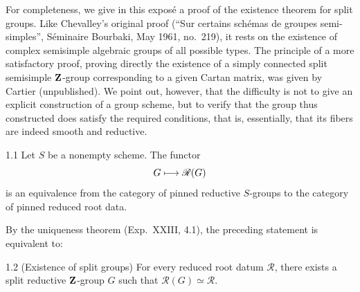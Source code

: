 \label{XXV}

\setcounter{footnote}{-1}
For completeness, we give in this expos\'e a proof of the existence theorem for split groups. Like Chevalley's original proof (``Sur certains sch\'emas de groupes semi-simples'', S\'eminaire Bourbaki, May 1961, no.~219), it rests on the existence of complex semisimple algebraic groups of all possible types. The principle of a more satisfactory proof, proving directly the existence of a simply connected split semisimple $\mathbf{Z}$-group corresponding to a given Cartan matrix, was given by Cartier (unpublished). We point out, however, that the difficulty is not to give an explicit construction of a group scheme, but to verify that the group thus constructed does satisfy the required conditions, that is, essentially, that its fibers are indeed smooth and reductive.

\begin{theorem}{1.1}\label{XXV.1.1}
Let $S$ be a nonempty scheme. The functor
\[
G\longmapsto\mathscr R(G)
\]
is an equivalence from the category of pinned reductive $S$-groups to the category of pinned reduced root data.
\end{theorem}
By the uniqueness theorem (Exp.~XXIII, 4.1), the preceding statement is equivalent to:
\begin{corollary}{1.2 (Existence of split groups)}\label{XXV.1.2}
For every reduced root datum $\mathscr R$, there exists a split reductive $\mathbf{Z}$-group $G$ such that $\mathscr R(G)\simeq\mathscr R$.
\end{corollary}

